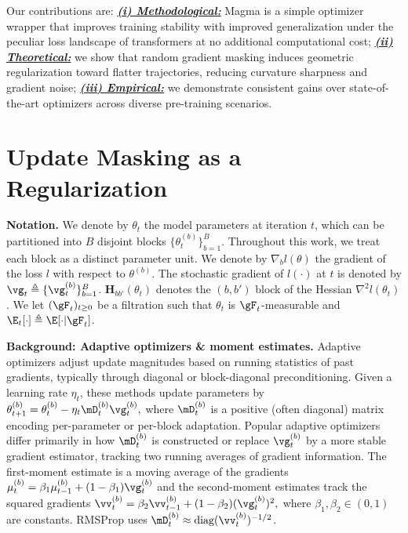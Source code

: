 \documentclass[11pt, a4paper, twocolumn, copyright, goog]{google}
\theoremstyle{plain}
\theoremstyle{definition}
\theoremstyle{remark}
\begin{document}
Our contributions are:
\underline{\textbf{\textit{(i) Methodological:}}} Magma is a simple optimizer wrapper that improves training stability with improved generalization under the peculiar loss landscape of transformers at no additional computational cost;
\underline{\textit{\textbf{(ii) Theoretical:}}} we show that random gradient masking induces geometric regularization toward flatter trajectories, reducing curvature sharpness and gradient noise;
\underline{\textbf{\textit{(iii) Empirical:}}} we demonstrate consistent gains over state-of-the-art optimizers across diverse pre-training scenarios.





\section{Update Masking as a Regularization} \label{subsec:implicit_reg}

\textbf{Notation.}
We denote by $\theta_t$ the model parameters at iteration $t$, which can be partitioned into $B$ disjoint blocks $\{ \theta_t^{(b)} \}_{b=1}^B$. 
Throughout this work, we treat each block as a distinct parameter unit.
We denote by $\nabla_b l(\theta)$ the gradient of the loss $l$ with respect to $\theta^{(b)}$. The stochastic gradient of $l(\cdot)$ at $t$ is denoted by $\vg_t \triangleq \{ \vg_t^{(b)} \}_{b=1}^B$.
$\mathbf{H}_{bb'}(\theta_t)$ denotes the $(b,b')$ block of the Hessian $\nabla^2 l(\theta_t)$. 
We let $(\gF_t)_{t \geq 0}$ be a filtration such that $\theta_t$ is $\gF_t$-measurable and $\E_t[\cdot] \triangleq \E [\cdot | \gF_t]$. 

\textbf{Background: Adaptive optimizers \& moment estimates.}
Adaptive optimizers adjust update magnitudes based on running statistics of past gradients, typically through diagonal or block-diagonal preconditioning. 
Given a learning rate $\eta_t$, these methods update parameters by $\theta_{t+1}^{(b)} = \theta_t^{(b)} - \eta_t \mD_t^{(b)} \vg_t^{(b)},$
where $\mD_t^{(b)}$ is a positive (often diagonal) matrix encoding per-parameter or per-block adaptation. 
Popular adaptive optimizers differ primarily in how $\mD_t^{(b)}$ is constructed or replace $\vg_t^{(b)}$ by a more stable gradient estimator, tracking two running averages of gradient information. The first-moment estimate is a moving average of the gradients $\mu_{t}^{(b)} = \beta_1 \mu_{t-1}^{(b)} + (1 - \beta_1) \vg_t^{(b)}$ and the second-moment estimates track the squared gradients $\vv_t^{(b)} = \beta_2 \vv_{t-1}^{(b)} + (1 - \beta_2) (\vg_t^{(b)})^2,$ where $\beta_1, \beta_2 \in (0,1)$ are constants.
RMSProp uses $\mD_t^{(b)} \approx \text{diag} (\vv_t^{(b)})^{-1/2}$.
\end{document}
